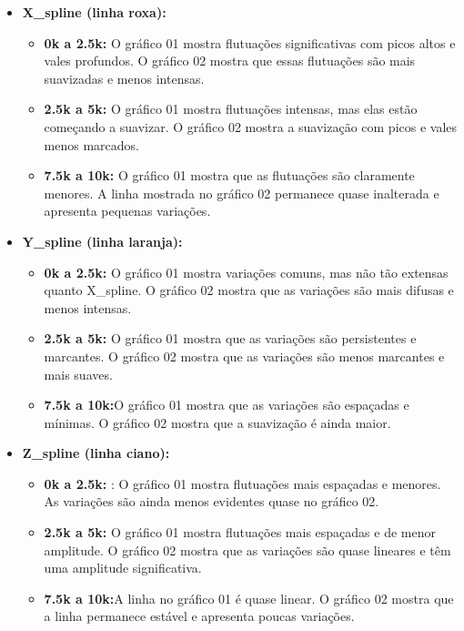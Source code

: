 \documentclass[12pt, a4paper]{article}
\begin{document}
    \begin{itemize}
        \item \textbf{X\_spline (linha roxa):}
              \begin{itemize}
                  \item \textbf{0k a 2.5k: }O gráfico 01 mostra flutuações significativas com picos altos e vales profundos. O gráfico 02 mostra que essas flutuações são mais suavizadas e menos intensas.
                  \item \textbf{2.5k a 5k: }O gráfico 01 mostra flutuações intensas, mas elas estão começando a suavizar. O gráfico 02 mostra a suavização com picos e vales menos marcados.
                  \item \textbf{7.5k a 10k:} O gráfico 01 mostra que as flutuações são claramente menores. A linha mostrada no gráfico 02 permanece quase inalterada e apresenta pequenas variações.
              \end{itemize}
        \item \textbf{Y\_spline (linha laranja):}
              \begin{itemize}
                  \item \textbf{0k a 2.5k: }O gráfico 01 mostra variações comuns, mas não tão extensas quanto X\_spline. O gráfico 02 mostra que as variações são mais difusas e menos intensas.
                  \item \textbf{2.5k a 5k: }O gráfico 01 mostra que as variações são persistentes e marcantes. O gráfico 02 mostra que as variações são menos marcantes e mais suaves.
                  \item \textbf{7.5k a 10k:}O gráfico 01 mostra que as variações são espaçadas e mínimas. O gráfico 02 mostra que a suavização é ainda maior.
              \end{itemize}
        \item \textbf{Z\_spline (linha ciano):}
              \begin{itemize}
                  \item \textbf{0k a 2.5k: }: O gráfico 01 mostra flutuações mais espaçadas e menores. As variações são ainda menos evidentes quase no gráfico 02. 
                  \item \textbf{2.5k a 5k: } O gráfico 01 mostra flutuações mais espaçadas e de menor amplitude. O gráfico 02 mostra que as variações são quase lineares e têm uma amplitude significativa. 
                  \item \textbf{7.5k a 10k:}A linha no gráfico 01 é quase linear. O gráfico 02 mostra que a linha permanece estável e apresenta poucas variações.
              \end{itemize}
    \end{itemize}
    
\end{document}

